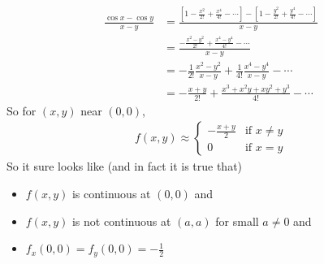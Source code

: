 \begin{eg}
\begin{align*}
\frac{\cos x-\cos y}{x-y}
&=\frac{\left[1-\frac{x^2}{2!} +\frac{x^4}{4!}-\cdots\right]
         -\left[1-\frac{y^2}{2!} +\frac{y^4}{4!}-\cdots\right]}{x-y} \\
&=\frac{-\frac{x^2-y^2}{2!} +\frac{x^4-y^4}{4!}-\cdots}{x-y} \\
&= -\frac{1}{2!}\frac{x^2-y^2}{x-y} +\frac{1}{4!}\frac{x^4-y^4}{x-y}-\cdots \\
&= -\frac{x+y}{2!} +\frac{x^3+x^2y+xy^2+y^3}{4!}-\cdots
\end{align*}
So for $(x,y)$ near $(0,0)$,
\begin{align*}
f(x,y)\approx\begin{cases}
                 -\frac{x+y}{2} &\text{if $x\ne y$} \\
                              0 &\text{if $x=y$}
             \end{cases}
\end{align*}
So it sure looks like (and in fact it is true that)
\begin{itemize}
\item 
$f(x,y)$ is continuous at $(0,0)$ and
\item
$f(x,y)$ is not continuous at $(a,a)$ for small $a\ne 0$ and
\item
$f_x(0,0)=f_y(0,0)=-\frac{1}{2}$
\end{itemize}

\end{eg}


